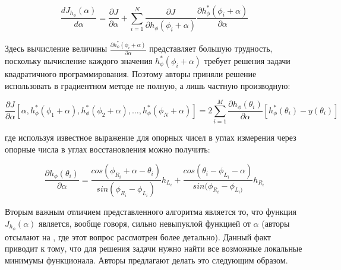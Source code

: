 \documentclass[a4paper, 12pt, titlepage]{article}
\theoremstyle{definition}
\theoremstyle{plain}
\begin{document}
\begin{equation}
\frac{d J_{h_{\phi}}(\alpha)}{d \alpha} = \frac{\partial J}{\partial \alpha} +
\sum \limits_{i = 1}^{N} \frac{\partial J}{\partial h_{\phi}(\phi_{i} + \alpha)}
\frac{\partial h_{\phi}^{*}(\phi_{i} + \alpha) }{\partial \alpha}
\end{equation}

Здесь вычисление величины
$\frac{\partial h_{\phi}^{*}(\phi_{i} + \alpha)}{\partial \alpha}$ представляет
большую трудность, поскольку вычисление каждого значения
$h_{\phi}^{*}(\phi_{i} + \alpha)$ требует решения задачи квадратичного
программирования. Поэтому авторы приняли решение использовать в градиентном
методе не полную, а лишь частную производную:

\begin{equation}
\frac{\partial J}{\partial \alpha} [\alpha,
h_{\phi}^{*}(\phi_{1} + \alpha), h_{\phi}^{*}(\phi_{2} + \alpha), \ldots,
h_{\phi}^{*}(\phi_{N} + \alpha)] =
2 \sum \limits_{i = 1}^{M}  \frac{\partial h_{\phi}(\theta_{i}) }{\partial
\alpha} [h_{\phi}^{*}(\theta_{i}) - y(\theta_{i})]
\end{equation}

где используя известное выражение для опорных чисел в углах измерения через
опорные числа в углах восстановления можно получить:

\begin{equation}
\frac{\partial h_{\phi}(\theta_{i})}{\partial \alpha} =
\frac{cos(\phi_{R_{i}} + \alpha - \theta_{i})}{sin(\phi_{R_{i}} - \phi_{L_{i}})}
h_{L_{i}} +
\frac{cos(\theta_{i} - \phi_{L_{i}} - \alpha)}{sin(\phi_{R_{i}} - \phi_{L_{i})}}
h_{R_{i}}
\end{equation}

Вторым важным отличием представленного алгоритма является то, что функция
$J_{h_{\phi}}(\alpha)$ является, вообще говоря, сильно невыпуклой функцией от
$\alpha$ (авторы отсылают на \cite{thesis/Lele90}, где этот вопрос рассмотрен
более детально). Данный факт приводит к тому, что для решения задачи нужно
найти все возможные локальные минимумы функционала. Авторы предлагают делать это
следующим образом.
\end{document}
